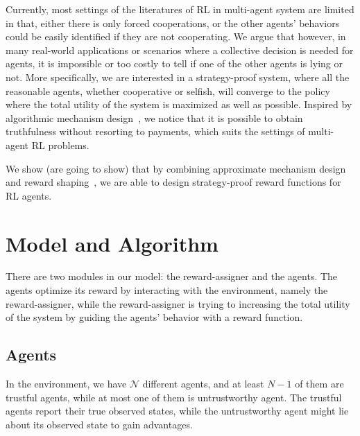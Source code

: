\documentclass{article}
\begin{document}
Currently, most settings of the literatures of RL in multi-agent system are limited in that,
either there is only forced cooperations,
or the other agents' behaviors could be easily identified if they are not cooperating.
We argue that however, in many real-world applications or scenarios where a collective decision is needed for agents,
it is impossible or too costly to tell if one of the other agents is lying or not.
More specifically, we are interested in a strategy-proof system,
where all the reasonable agents, whether cooperative or selfish,
will converge to the policy where the total utility of the system is maximized as well as possible.
Inspired by algorithmic mechanism design~\cite{alon2010strategyproof,procaccia2009approximate}, we notice that it is possible to obtain truthfulness without resorting to payments,
which suits the settings of multi-agent RL problems.

We show (are going to show) that by combining approximate mechanism design and reward shaping~\cite{ng1999policy},
we are able to design strategy-proof reward functions for RL agents.




\section{Model and Algorithm}

There are two modules in our model: the reward-assigner and the agents.
The agents optimize its reward by interacting with the environment, namely the reward-assigner,
while the reward-assigner is trying to increasing the total utility of the system by
guiding the agents' behavior with a reward function.

\subsection{Agents}
In the environment, we have \(\mathcal{N}\) different agents,
and at least \(N-1\) of them are trustful agents, while at most one of them is untrustworthy agent.
The trustful agents report their true observed states,
while the untrustworthy agent might lie about its observed state to gain advantages.
\end{document}

